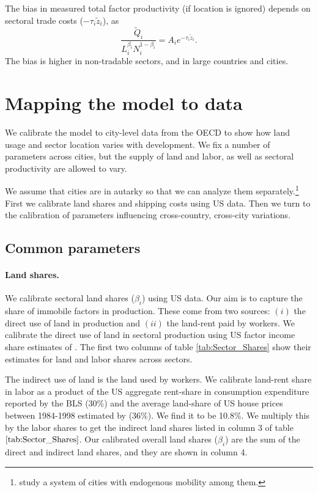 \documentclass[12pt]{article}
\begin{document}
The bias in measured total factor productivity (if location is ignored) depends on sectoral trade costs ($-\tau_i\tilde z_i$), as
\begin{equation}
\frac{\tilde Q_i}{L_i^{\beta_i}N_i^{1-\beta_i}} = A_i e^{-\tau_i \tilde z_i}.
\end{equation}
The bias is higher in non-tradable sectors, and in large countries and cities.


\section{Mapping the model to data}
We calibrate the model to city-level data from the OECD to show how land usage and sector location varies with development. We fix a number of parameters across cities, but the supply of land and labor, as well as sectoral productivity are allowed to vary.

We assume that cities are in autarky so that we can analyze them separately.\footnote{ study a system of cities with endogenous mobility among them.} First we calibrate land shares and shipping costs using US data. Then we turn to the calibration of parameters influencing cross-country, cross-city variations.

\subsection{Common parameters}
\paragraph{Land shares.}
We calibrate sectoral land shares ($\beta_i$) using US data. Our aim is to capture the share of immobile factors in production. These come from two sources: $(i)$ the direct use of land in production and $(ii)$ the land-rent paid by workers. We calibrate the direct use of land in sectoral production using US factor income share estimates of . The first two columns of table \ref{tab:Sector_Shares} show their estimates for land and labor shares across sectors.

The indirect use of land is the land used by workers. We calibrate land-rent share in labor as a product of the US aggregate rent-share in consumption expenditure reported by the BLS ($30\%$) and the average land-share of US house prices between 1984-1998 estimated by  (36\%). We find it to be 10.8\%. We multiply this by the labor shares to get the indirect land shares listed in column 3 of table $\ref{tab:Sector_Shares}$. Our calibrated overall land shares ($\beta_i$) are the sum of the direct and indirect land shares, and they are shown in column 4.
\end{document}
